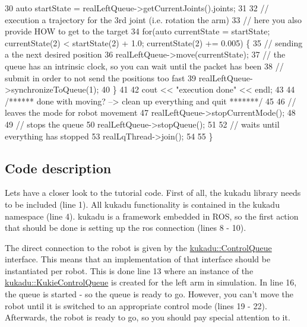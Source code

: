 \begin{DoxyCodeInclude}
30     \textcolor{keyword}{auto} startState = realLeftQueue->getCurrentJoints().joints;
31 
32     \textcolor{comment}{// execution a trajectory for the 3rd joint (i.e. rotation the arm)}
33     \textcolor{comment}{// here you also provide HOW to get to the target}
34     \textcolor{keywordflow}{for}(\textcolor{keyword}{auto} currentState = startState; currentState(2) < startState(2) + 1.0; currentState(2) += 0.005) \{
35         \textcolor{comment}{// sending a the next desired position}
36         realLeftQueue->move(currentState);
37         \textcolor{comment}{// the queue has an intrinsic clock, so you can wait until the packet has been}
38         \textcolor{comment}{// submit in order to not send the positions too fast}
39         realLeftQueue->synchronizeToQueue(1);
40     \}
41 
42     cout << \textcolor{stringliteral}{"execution done"} << endl;
43 
44     \textcolor{comment}{/****** done with moving? --> clean up everything and quit *******/}
45 
46     \textcolor{comment}{// leaves the mode for robot movement}
47     realLeftQueue->stopCurrentMode();
48 
49     \textcolor{comment}{// stops the queue}
50     realLeftQueue->stopQueue();
51 
52     \textcolor{comment}{// waits until everything has stopped}
53     realLqThread->join();
54 
55 \}
\end{DoxyCodeInclude}


\subsection*{Code description}

Lets have a closer look to the tutorial code. First of all, the kukadu library needs to be included (line 1). All kukadu functionality is contained in the kukadu namespace (line 4). kukadu is a framework embedded in R\-O\-S, so the first action that should be done is setting up the ros connection (lines 8 -\/ 10).

The direct connection to the robot is given by the \hyperlink{classkukadu_1_1ControlQueue}{kukadu\-::\-Control\-Queue} interface. This means that an implementation of that interface should be instantiated per robot. This is done line 13 where an instance of the \hyperlink{classkukadu_1_1KukieControlQueue}{kukadu\-::\-Kukie\-Control\-Queue} is created for the left arm in simulation. In line 16, the queue is started -\/ so the queue is ready to go. However, you can't move the robot until it is switched to an appropriate control mode (lines 19 -\/ 22). Afterwards, the robot is ready to go, so you should pay special attention to it.

